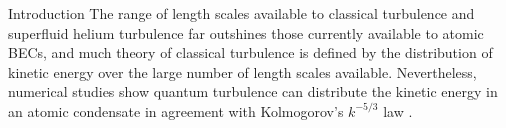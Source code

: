 \begin{chapter}{\label{cha:bose_gases}Introduction}
The range of length scales available to classical turbulence and superfluid helium turbulence far outshines those currently available to atomic BECs, and much theory of classical turbulence is defined by the distribution of kinetic energy over the large number of length scales available. Nevertheless, numerical studies show quantum turbulence can distribute the kinetic energy in an atomic condensate in agreement with Kolmogorov's $k^{-5/3}$ law \cite{Nore,Kobayashi,PhysRevLett.103.084501}.



\end{chapter}
